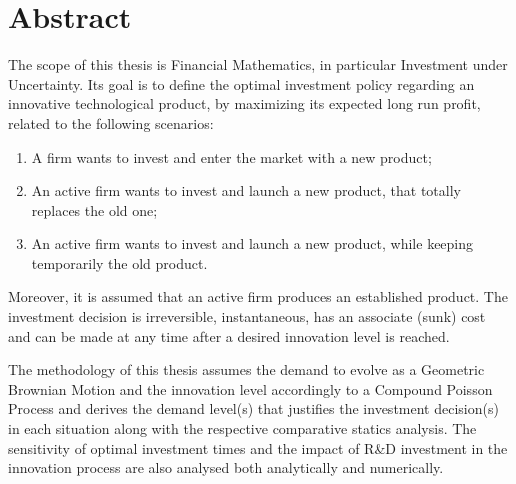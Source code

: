 
\section*{Abstract}


The scope of this thesis is Financial Mathematics, in particular Investment under Uncertainty.
Its goal is to define the optimal investment policy regarding an innovative technological product, by maximizing its expected long run profit, related to
the following scenarios:
\begin{enumerate}
	\item A firm wants to invest and enter the market with a new product;
	\item An active firm wants to invest and launch a new product, that totally replaces the old one; 
	\item An active firm wants to invest and launch a new product, while keeping temporarily the old product.
\end{enumerate}

Moreover,
it is assumed  that an active firm produces an established product. The investment decision is irreversible, instantaneous, has an associate (sunk) cost and can be made at any time after a desired innovation level is reached.

The methodology of this thesis assumes the demand to evolve as a Geometric Brownian Motion and the innovation level accordingly to a Compound Poisson Process and derives the demand level(s) that justifies the investment decision(s) in each situation along with the respective comparative statics analysis. The sensitivity of optimal investment times and the impact of R\&D investment in the innovation process are also analysed both analytically and numerically.

